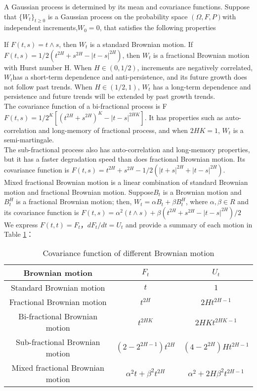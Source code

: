 \documentclass[preprint,12pt]{elsarticle}
\begin{document}
A Gaussian process is determined by its mean and covariance functions. Suppose that $\{W_t\}_{t\geq 0}$ is a Gaussian process on the probability space $(\Omega,F,P)$with independent increments,$W_0=0$, that satisfies the following properties

If $F(t,s)=t\wedge s$, then $W_t$ is a standard Brownian motion. If $F(t,s)=1/2(t^{2H}+s^{2H}-|t-s|^{2H})$, then $W_t$  is a fractional Brownian motion with Hurst number H. When $H\in(0,1/2)$, increments are negatively correlated, $W_t$has a short-term dependence and anti-persistence, and its future growth does not follow past trends. When $H\in(1/2,1)$, $W_t$  has a long-term dependence and persistence and future trends will be extended by past growth trends.\\
The covariance function of a bi-fractional process is F$F(t,s)=1/2^K[(t^{2H}+s^{2H})^K-|t-s|^{2HK}]$. It has properties such as auto-correlation and long-memory of fractional process, and when $2HK=1$, $W_t$ is a semi-martingale.\\
The sub-fractional process also has auto-correlation and long-memory properties, but it has a faster degradation speed than does fractional Brownian motion. Its covariance function is $F(t,s)=t^{2H}+s^{2H}-1/2(|t+s|^{2H}+|t-s|^{2H})$.\\
Mixed fractional Brownian motion is a linear combination of standard Brownian motion and fractional Brownian motion. Suppose$B_t$ is a Brownian motion and $B_t^H$ is a fractional Brownian motion; then, $W_t=\alpha B_t+\beta B_t^H$, where $\alpha,\beta \in R$ and its covariance function is  $F(t,s)=\alpha^2(t\wedge s)+\beta(t^{2H}+s^{2H}-|t-s|^{2H})/2$ 
We express $F(t,t)=F_t$，$dF_t/dt=U_t$ and provide a summary of each motion in Table \ref{tabl1}：

\begin{table}[htbp]
\centering
\caption{Covariance function of different Brownian motion}
\label{tabl1}
\begin{tabular}{ccc}
\hline
Brownian motion& $F_t$ & $U_t$ \\
\hline
Standard Brownian motion & $t$ & $1$ \\
Fractional Brownian motion& $t^{2H}$ & $2Ht^{2H-1}$ \\
Bi-fractional Brownian motion & $t^{2HK}$ & $2HKt^{2HK-1}$ \\
Sub-fractional Brownian motion & $(2-2^{2H-1})t^{2H}$ & $(4-2^{2H})Ht^{2H-1}$ \\
Mixed fractional Brownian motion & $\alpha^2t+\beta^2t^{2H}$ & $\alpha^2+2H\beta^2t^{2H-1}$ \\
\hline
\end{tabular}
\end{table}
\end{document}
